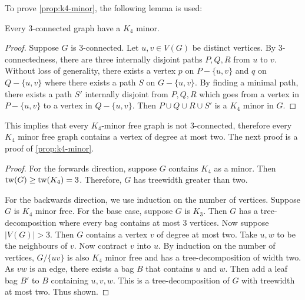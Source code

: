 To prove \cref{prop:k4-minor}, the following lemma is used:
\begin{lemma}
	Every $3$-connected graph have a $K_4$ minor. 
\end{lemma}
\begin{proof}
	Suppose $G$ is $3$-connected. Let $u, v \in V(G)$ be distinct vertices. By $3$-connectedness, there are three internally disjoint paths $P, Q, R$ from $u$ to $v$. Without loss of generality, there exists a vertex $p$ on $P -\{u, v\}$ and $q$ on $Q -\{u, v\}$ where there exists a path $S$ on $G - \{u, v\}$. By finding a minimal path, there exists a path $S'$ internally disjoint from $P, Q, R$ which goes from a vertex in $P - \{u, v\}$ to a vertex in $Q - \{u, v\}$. Then $P \cup Q \cup R \cup S'$ is a $K_4$ minor in $G$. 
\end{proof}

This implies that every $K_4$-minor free graph is not $3$-connected, therefore every $K_4$ minor free graph contains a vertex of degree at most two. The next proof is a proof of \cref{prop:k4-minor}.

\begin{proof}
	For the forwards direction, suppose $G$ contains $K_4$ as a minor. Then $\operatorname{tw}(G) \geq \operatorname{tw}(K_4) = 3$. Therefore, $G$ has treewidth greater than two. 

	For the backwards direction, we use induction on the number of vertices. Suppose $G$ is $K_4$ minor free. For the base case, suppose $G$ is $K_3$. Then $G$ has a tree-decomposition where every bag contains at most $3$ vertices. Now suppose $|V(G)| > 3$. Then $G$ contains a vertex $v$ of degree at most two. Take $u, w$ to be the neighbours of $v$. Now contract $v$ into $u$. By induction on the number of vertices, $G / \{uv\}$ is also $K_4$ minor free and has a tree-decomposition of width two. As $vw$ is an edge, there exists a bag $B$ that contains $u$ and $w$. Then add a leaf bag $B'$ to $B$ containing $u, v, w$. This is a tree-decomposition of $G$ with treewidth at most two. Thus shown. 
\end{proof}


